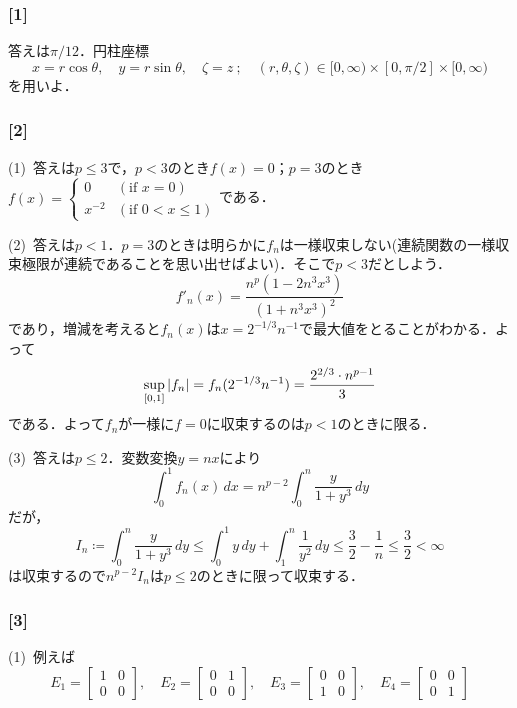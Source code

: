 \documentclass[a4j]{ltjsarticle}
\newcommand{\1}{\mathbbm{1}}
\numberwithin{equation}{section}
\theoremstyle{definition}
\begin{document}
\subsubsection*{[1]}
答えは$\pi/12$．円柱座標
\begin{equation}
    x=r\cos\theta,\quad y=r\sin\theta,\quad \zeta=z\ ;\quad (r,\theta,\zeta)\in [0,\infty)\times [0,\pi/2]\times [0,\infty)
\end{equation}
を用いよ．
\subsubsection*{[2]}
(1)\ 答えは$p\leq 3$で，$p<3$のとき$f(x)=0$；$p=3$のとき$f(x)=\begin{cases}
    0 & (\text{if $x=0$})\\
    x^{-2} & (\text{if $0<x\leq 1$})
\end{cases}$である．

(2)\ 答えは$p<1$．$p=3$のときは明らかに$f_n$は一様収束しない(連続関数の一様収束極限が連続であることを思い出せばよい)．そこで$p<3$だとしよう．
\begin{equation}
    f'_n(x)=\frac{n^p(1-2n^3x^3)}{(1+n^3x^3)^2}
\end{equation}
であり，増減を考えると$f_n(x)$は$x=2^{-1/3}n^{-1}$で最大値をとることがわかる．よって
\begin{equation}
    \sup_{[0,1]}\abs{f_n}=f_n(2^{-1/3}n^{-1})=\frac{2^{2/3}\cdot n^{p-1}}{3}
\end{equation}
である．よって$f_n$が一様に$f=0$に収束するのは$p<1$のときに限る．

(3)\ 答えは$p\leq 2$．変数変換$y=nx$により
\begin{equation}
    \int_0^1f_n(x)\,dx=n^{p-2}\int_0^n\frac{y}{1+y^3}\,dy
\end{equation}
だが，
\begin{equation}
    I_n\coloneq \int_0^n\frac{y}{1+y^3}\,dy\leq \int_0^1y\,dy+\int_1^n\frac{1}{y^2}\,dy\leq \frac{3}{2}-\frac{1}{n}\leq \frac{3}{2}<\infty 
\end{equation}
は収束するので$n^{p-2} I_n$は$p\leq 2$のときに限って収束する．
\subsubsection*{[3]}
(1)\ 例えば
\begin{equation}
    E_1=\begin{bmatrix}
        1 & 0\\
        0 & 0
    \end{bmatrix},\quad E_2=\begin{bmatrix}
        0 & 1\\
        0 & 0
    \end{bmatrix},\quad E_3=\begin{bmatrix}
        0 & 0\\
        1 & 0
    \end{bmatrix},\quad E_4=\begin{bmatrix}
        0 & 0\\
        0 & 1
    \end{bmatrix}
\end{equation}
\end{document}
